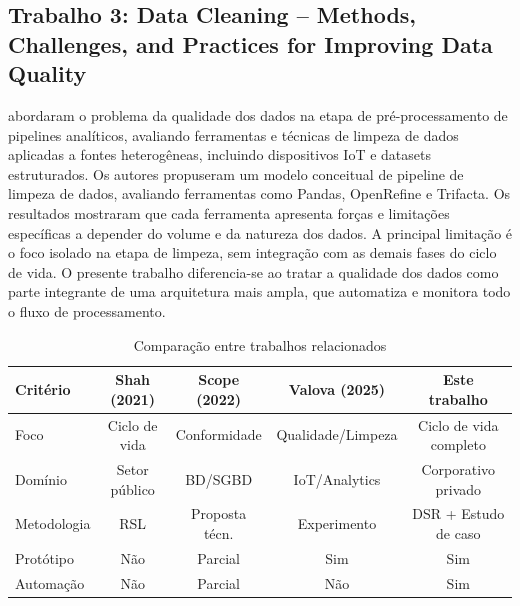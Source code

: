 \documentclass[
    12pt,                %
    openright,           %
    oneside,             %
    a4paper,             %
    english,             %
    brazil               %
]{abntex2}
\begin{document}
\subsection{Trabalho 3: Data Cleaning -- Methods, Challenges, and Practices for Improving Data Quality}

 abordaram o problema da qualidade dos dados na etapa de pré-processamento de pipelines analíticos, avaliando ferramentas e técnicas de limpeza de dados aplicadas a fontes heterogêneas, incluindo dispositivos IoT e datasets estruturados. Os autores propuseram um modelo conceitual de pipeline de limpeza de dados, avaliando ferramentas como Pandas, OpenRefine e Trifacta. Os resultados mostraram que cada ferramenta apresenta forças e limitações específicas a depender do volume e da natureza dos dados. A principal limitação é o foco isolado na etapa de limpeza, sem integração com as demais fases do ciclo de vida. O presente trabalho diferencia-se ao tratar a qualidade dos dados como parte integrante de uma arquitetura mais ampla, que automatiza e monitora todo o fluxo de processamento.

\vspace{0.5cm}

\begin{table}[htb]
    \centering
    \caption{Comparação entre trabalhos relacionados}
    \label{tab:trabalhos_relacionados}
    \begin{tabular}{l|c|c|c|c}
        \toprule
        \textbf{Critério} & \textbf{Shah (2021)} & \textbf{Scope (2022)} & \textbf{Valova (2025)} & \textbf{Este trabalho} \\
        \midrule
        Foco              & Ciclo de vida & Conformidade  & Qualidade/Limpeza & Ciclo de vida completo \\
        \midrule
        Domínio           & Setor público & BD/SGBD       & IoT/Analytics     & Corporativo privado \\
        \midrule
        Metodologia       & RSL           & Proposta técn.& Experimento       & DSR + Estudo de caso \\
        \midrule
        Protótipo         & Não           & Parcial       & Sim               & Sim \\
        \midrule
        Automação         & Não           & Parcial       & Não               & Sim \\
        \bottomrule
    \end{tabular}
\end{table}
\end{document}
